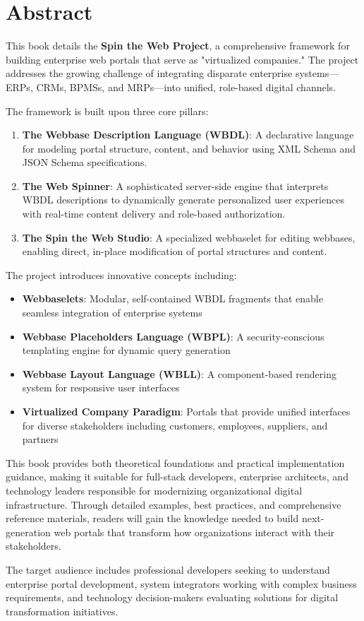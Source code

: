 
\chapter*{Abstract}

This book details the \textbf{Spin the Web Project}, a comprehensive framework for building enterprise web portals that serve as "virtualized companies." The project addresses the growing challenge of integrating disparate enterprise systems—ERPs, CRMs, BPMSs, and MRPs—into unified, role-based digital channels.

The framework is built upon three core pillars:

\begin{enumerate}
\item \textbf{The Webbase Description Language (WBDL)}: A declarative language for modeling portal structure, content, and behavior using XML Schema and JSON Schema specifications.

\item \textbf{The Web Spinner}: A sophisticated server-side engine that interprets WBDL descriptions to dynamically generate personalized user experiences with real-time content delivery and role-based authorization.

\item \textbf{The Spin the Web Studio}: A specialized webbaselet for editing webbases, enabling direct, in-place modification of portal structures and content.
\end{enumerate}

The project introduces innovative concepts including:
\begin{itemize}
\item \textbf{Webbaselets}: Modular, self-contained WBDL fragments that enable seamless integration of enterprise systems
\item \textbf{Webbase Placeholders Language (WBPL)}: A security-conscious templating engine for dynamic query generation
\item \textbf{Webbase Layout Language (WBLL)}: A component-based rendering system for responsive user interfaces
\item \textbf{Virtualized Company Paradigm}: Portals that provide unified interfaces for diverse stakeholders including customers, employees, suppliers, and partners
\end{itemize}

This book provides both theoretical foundations and practical implementation guidance, making it suitable for full-stack developers, enterprise architects, and technology leaders responsible for modernizing organizational digital infrastructure. Through detailed examples, best practices, and comprehensive reference materials, readers will gain the knowledge needed to build next-generation web portals that transform how organizations interact with their stakeholders.

The target audience includes professional developers seeking to understand enterprise portal development, system integrators working with complex business requirements, and technology decision-makers evaluating solutions for digital transformation initiatives.

\clearpage
